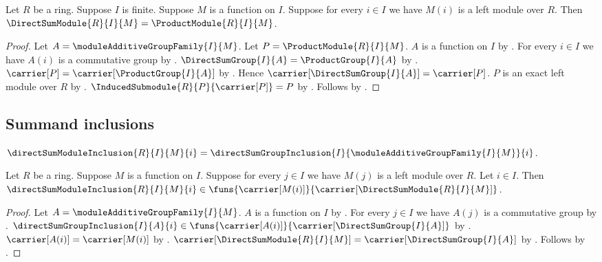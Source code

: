 \begin{theorem}\label{finite_direct_sum_module_eq_product_module}
    Let $R$ be a ring.
    Suppose $I$ is finite.
    Suppose $M$ is a function on $I$.
    Suppose for every $i\in I$ we have $M(i)$ is a left module over $R$.
    Then $\DirectSumModule{R}{I}{M}=\ProductModule{R}{I}{M}$.
\end{theorem}
\begin{proof}
    Let $A=\moduleAdditiveGroupFamily{I}{M}$.
    Let $P=\ProductModule{R}{I}{M}$.
    $A$ is a function on $I$ by
        .
    For every $i\in I$ we have $A(i)$ is a commutative group by
        .
    $\DirectSumGroup{I}{A}=\ProductGroup{I}{A}$ by
        .
    $\carrier[P]=\carrier[\ProductGroup{I}{A}]$ by
        .
    Hence $\carrier[\DirectSumGroup{I}{A}]=\carrier[P]$.
    $P$ is an exact left module over $R$ by
        .
    $\InducedSubmodule{R}{P}{\carrier[P]}=P$ by
        .
    Follows by .
\end{proof}

\subsection{Summand inclusions}

\begin{definition}\label{direct_sum_module_inclusion}
    $\directSumModuleInclusion{R}{I}{M}{i}
        =\directSumGroupInclusion{I}{
            \moduleAdditiveGroupFamily{I}{M}}{i}$.
\end{definition}

\begin{proposition}\label{direct_sum_module_inclusion_type}
    Let $R$ be a ring.
    Suppose $M$ is a function on $I$.
    Suppose for every $j\in I$ we have $M(j)$ is a left module over $R$.
    Let $i\in I$.
    Then $\directSumModuleInclusion{R}{I}{M}{i}\in
        \funs{\carrier[M(i)]}{
            \carrier[\DirectSumModule{R}{I}{M}]}$.
\end{proposition}
\begin{proof}
    Let $A=\moduleAdditiveGroupFamily{I}{M}$.
    $A$ is a function on $I$ by
        .
    For every $j\in I$ we have $A(j)$ is a commutative group by
        .
    $\directSumGroupInclusion{I}{A}{i}\in
        \funs{\carrier[A(i)]}{\carrier[\DirectSumGroup{I}{A}]}$ by
        .
    $\carrier[A(i)]=\carrier[M(i)]$ by
        .
    $\carrier[\DirectSumModule{R}{I}{M}]
        =\carrier[\DirectSumGroup{I}{A}]$ by
        .
    Follows by .
\end{proof}

